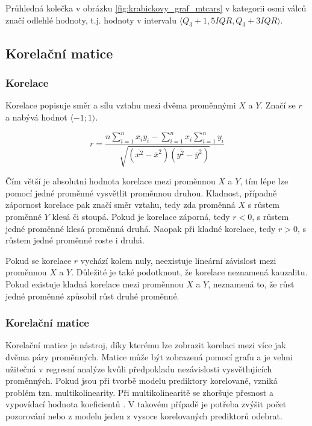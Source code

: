 Průhledná kolečka v obrázku \ref{fig:krabickovy_graf_mtcars} v kategorii osmi válců značí odlehlé hodnoty, t.j. hodnoty
v intervalu $\langle Q_3 + 1,5IQR, Q_3 + 3IQR \rangle$.


\subsection{Korelační matice}
\subsubsection{Korelace}
Korelace popisuje směr a sílu vztahu mezi dvěma proměnnými $X$ a $Y$. Značí se $r$ a nabývá hodnot $\langle -1; 1 \rangle$.

\begin{equation}
r = \frac{n \sum_{i=1}^n x_i y_i - \sum_{i=1}^n x_i \sum_{i=1}^n y_i}
{\sqrt{(\overline{x^2} - \overline{x}^2)(\overline{y^2} - \overline{y}^2)}}
\end{equation}

Čím větší je absolutní hodnota korelace mezi proměnnou $X$ a $Y$, tím lépe lze pomocí jedné proměnné vysvětlit proměnnou druhou. Kladnost, případně zápornost korelace
pak značí směr vztahu, tedy zda proměnná $X$ s růstem proměnné $Y$ klesá či stoupá. Pokud je korelace záporná, tedy $r < 0$, s růstem jedné proměnné klesá proměnná druhá.
Naopak při kladné korelace, tedy $r > 0$, s růstem jedné proměnné roste i druhá.

Pokud se korelace $r$ vychází kolem nuly, neexistuje lineární závislost mezi proměnnou $X$ a $Y$. Důležité je také podotknout, že korelace neznamená kauzalitu. Pokud
existuje kladná korelace mezi proměnnou $X$ a $Y$, neznamená to, že růst jedné proměnné způsobil růst druhé proměnné.  


\subsubsection{Korelační matice}
Korelační matice je nástroj, díky kterému lze zobrazit korelaci mezi více jak dvěma páry proměnných. Matice může být zobrazená pomocí grafu a
je velmi užitečná v regresní analýze kvůli předpokladu nezávislosti vysvětlujících proměnných.
Pokud jsou při tvorbě modelu prediktory korelované, vzniká problém tzn. multikolinearity. Při multikolinearitě se zhoršuje přesnost a 
vypovídací hodnota koeficientů \cite{kleinbaum_logistic_2010}. V takovém případě je potřeba zvýšit počet pozorování nebo z modelu jeden z vysoce 
korelovaných prediktorů odebrat. 


